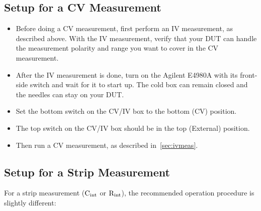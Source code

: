 \documentclass[a4paper]{article}
\begin{document}
\subsection{Setup for a CV Measurement}
\label{sec:cvsetup}

\begin{itemize}
\item Before doing a CV measurement, first perform an IV measurement, as described above.
With the IV measurement, verify that your DUT can handle the measurement polarity and range you want to cover in the CV measurement.
\item After the IV measurement is done, turn on the Agilent E4980A with its front-side switch and wait for it to start up.
The cold box can remain closed and the needles can stay on your DUT.
\item Set the bottom switch on the CV/IV box to the bottom (CV) position.
\item The top switch on the CV/IV box should be in the top (External) position.
\item Then run a CV measurement, as described in~\ref{sec:ivmeas}.\\
\end{itemize}

\subsection{Setup for a Strip Measurement}
\label{sec:stripsetup}

For a strip measurement (${\rm C_{int}}$ or ${\rm R_{int}}$), the recommended operation procedure is slightly different:
\end{document}
